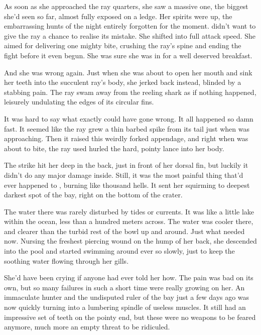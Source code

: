 As soon as she approached the ray quarters, she saw a massive one, the biggest she'd seen so far, almost fully exposed on a ledge. Her spirits were up, the embarrassing hunts of the night entirely forgotten for the moment. \sharknameformal didn't want to give the ray a chance to realise its mistake. She shifted into full attack speed. She aimed for delivering one mighty bite, crushing the ray's spine and ending the fight before it even begun. She was sure she was in for a well deserved breakfast. 

And she was wrong again. Just when she was about to open her mouth and sink her teeth into the succulent ray's body, she jerked back instead, blinded by a stabbing pain. The ray swam away from the reeling shark as if nothing happened, leisurely undulating the edges of its circular fins.

It was hard to say what exactly could have gone wrong. It all happened so damn fast. It seemed like the ray grew a thin barbed spike from its tail just when \sharknameformal was approaching. Then it raised this weirdly forked appendage, and right when \sharknameformal was about to bite, the ray used hurled the hard, pointy lance into her body.

The strike hit her deep in the back, just in front of her dorsal fin, but luckily it didn't do any major damage inside. Still, it was the most painful thing that'd ever happened to \sharknameformal, burning like thousand hells. It sent her squirming to deepest darkest spot of the bay, right on the bottom of the crater.

The water there was rarely disturbed by tides or currents. It was like a little lake within the ocean, less than a hundred meters across. The water was cooler there, and clearer than the turbid rest of the bowl up and around. Just what \sharknameformal needed now. Nursing the freshest piercing wound on the hump of her back, she descended into the pool and started swimming around ever so slowly, just to keep the soothing water flowing through her gills.

She'd have been crying if anyone had ever told her how. The pain was bad on its own, but so many failures in such a short time were really growing on her. An immaculate hunter and the undisputed ruler of the bay just a few days ago was now quickly turning into a lumbering spindle of useless muscles. It still had an impressive set of teeth on the pointy end, but these were no weapons to be feared anymore, much more an empty threat to be ridiculed.

